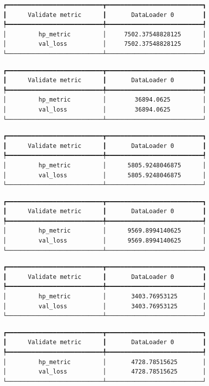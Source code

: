 \documentclass[
  letterpaper,
  DIV=11,
  numbers=noendperiod]{scrreprt}
\begin{document}
\begin{verbatim}
┏━━━━━━━━━━━━━━━━━━━━━━━━━━━┳━━━━━━━━━━━━━━━━━━━━━━━━━━━┓
┃      Validate metric      ┃       DataLoader 0        ┃
┡━━━━━━━━━━━━━━━━━━━━━━━━━━━╇━━━━━━━━━━━━━━━━━━━━━━━━━━━┩
│         hp_metric         │     7502.37548828125      │
│         val_loss          │     7502.37548828125      │
└───────────────────────────┴───────────────────────────┘
\end{verbatim}

\begin{verbatim}
┏━━━━━━━━━━━━━━━━━━━━━━━━━━━┳━━━━━━━━━━━━━━━━━━━━━━━━━━━┓
┃      Validate metric      ┃       DataLoader 0        ┃
┡━━━━━━━━━━━━━━━━━━━━━━━━━━━╇━━━━━━━━━━━━━━━━━━━━━━━━━━━┩
│         hp_metric         │        36894.0625         │
│         val_loss          │        36894.0625         │
└───────────────────────────┴───────────────────────────┘
\end{verbatim}

\begin{verbatim}
┏━━━━━━━━━━━━━━━━━━━━━━━━━━━┳━━━━━━━━━━━━━━━━━━━━━━━━━━━┓
┃      Validate metric      ┃       DataLoader 0        ┃
┡━━━━━━━━━━━━━━━━━━━━━━━━━━━╇━━━━━━━━━━━━━━━━━━━━━━━━━━━┩
│         hp_metric         │      5805.9248046875      │
│         val_loss          │      5805.9248046875      │
└───────────────────────────┴───────────────────────────┘
\end{verbatim}

\begin{verbatim}
┏━━━━━━━━━━━━━━━━━━━━━━━━━━━┳━━━━━━━━━━━━━━━━━━━━━━━━━━━┓
┃      Validate metric      ┃       DataLoader 0        ┃
┡━━━━━━━━━━━━━━━━━━━━━━━━━━━╇━━━━━━━━━━━━━━━━━━━━━━━━━━━┩
│         hp_metric         │      9569.8994140625      │
│         val_loss          │      9569.8994140625      │
└───────────────────────────┴───────────────────────────┘
\end{verbatim}

\begin{verbatim}
┏━━━━━━━━━━━━━━━━━━━━━━━━━━━┳━━━━━━━━━━━━━━━━━━━━━━━━━━━┓
┃      Validate metric      ┃       DataLoader 0        ┃
┡━━━━━━━━━━━━━━━━━━━━━━━━━━━╇━━━━━━━━━━━━━━━━━━━━━━━━━━━┩
│         hp_metric         │       3403.76953125       │
│         val_loss          │       3403.76953125       │
└───────────────────────────┴───────────────────────────┘
\end{verbatim}

\begin{verbatim}
┏━━━━━━━━━━━━━━━━━━━━━━━━━━━┳━━━━━━━━━━━━━━━━━━━━━━━━━━━┓
┃      Validate metric      ┃       DataLoader 0        ┃
┡━━━━━━━━━━━━━━━━━━━━━━━━━━━╇━━━━━━━━━━━━━━━━━━━━━━━━━━━┩
│         hp_metric         │       4728.78515625       │
│         val_loss          │       4728.78515625       │
└───────────────────────────┴───────────────────────────┘
\end{verbatim}
\end{document}
